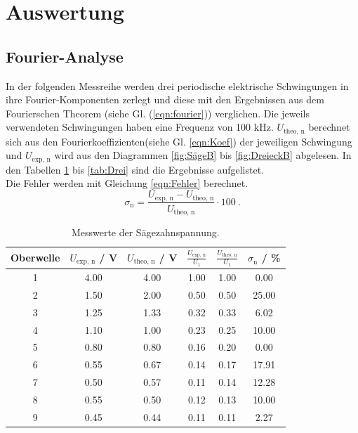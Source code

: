 \section{Auswertung}
\label{sec:Auswertung}

\subsection{Fourier-Analyse}
\label{sec:Analyse}
In der folgenden Messreihe werden drei periodische elektrische Schwingungen in ihre Fourier-Komponenten zerlegt und diese mit den Ergebnissen aus dem Fourierschen Theorem (siehe Gl. (\ref{eqn:fourier})) verglichen. Die jeweils verwendeten Schwingungen haben eine Frequenz von 100 kHz. $U_\text{theo, n}$ berechnet sich aus den Fourierkoeffizienten(siehe Gl. \ref{eqn:Koef}) der jeweiligen Schwingung und $U_\text{exp, n}$ wird aus den Diagrammen \ref{fig:SägeB} bis \ref{fig:DreieckB} abgelesen. In den Tabellen \ref{tab:Säge} bis \ref{tab:Drei} sind die Ergebnisse aufgelistet. \\
Die Fehler werden mit Gleichung \ref{eqn:Fehler} berechnet.
\begin{equation}
  \sigma_\text{n} = \frac{U_\text{exp, n} - U_\text{theo, n}}{U_\text{theo, n}} \cdot 100 \ .
  \label{eqn:Fehler}
\end{equation}

\begin{table}[H] %
  \centering
  \begin{tabular}{c | c | c | c | c | c}
    \toprule
    Oberwelle & $U_\text{exp, n}$ / V & $U_\text{theo, n}$ / V & $\frac{U_\text{exp, n}}{U_1}$ & $\frac{U_\text{theo, n}}{U_1}$ & $\sigma_\text{n}$ / \% \\
    \midrule
    1  & 4.00 & 4.00 & 1.00 & 1.00 & 0.00  \\
    2  & 1.50 & 2.00 & 0.50 & 0.50 & 25.00 \\
    3  & 1.25 & 1.33 & 0.32 & 0.33 & 6.02  \\
    4  & 1.10 & 1.00 & 0.23 & 0.25 & 10.00 \\
    5  & 0.80 & 0.80 & 0.16 & 0.20 & 0.00  \\
    6  & 0.55 & 0.67 & 0.14 & 0.17 & 17.91 \\
    7  & 0.50 & 0.57 & 0.11 & 0.14 & 12.28 \\
    8  & 0.55 & 0.50 & 0.12 & 0.13 & 10.00 \\
    9  & 0.45 & 0.44 & 0.11 & 0.11 & 2.27  \\
    \bottomrule
  \end{tabular}
  \caption{Messwerte der Sägezahnspannung.}
  \label{tab:Säge}
\end{table}

